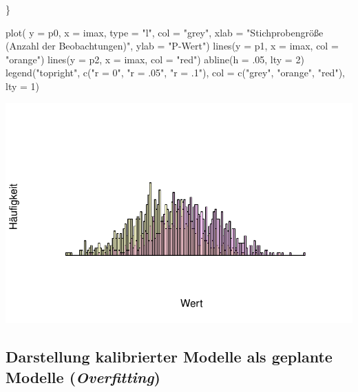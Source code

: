 \documentclass[
  letterpaper,
  DIV=11,
  numbers=noendperiod]{scrreprt}
\newenvironment{Shaded}{\begin{snugshade}}{\end{snugshade}}
\newcommand{\AttributeTok}[1]{\textcolor[rgb]{0.40,0.45,0.13}{#1}}
\newcommand{\DecValTok}[1]{\textcolor[rgb]{0.68,0.00,0.00}{#1}}
\newcommand{\FunctionTok}[1]{\textcolor[rgb]{0.28,0.35,0.67}{#1}}
\newcommand{\NormalTok}[1]{\textcolor[rgb]{0.00,0.23,0.31}{#1}}
\newcommand{\StringTok}[1]{\textcolor[rgb]{0.13,0.47,0.30}{#1}}
\begin{document}
\begin{Shaded}
\begin{Highlighting}[]
\NormalTok{\} }

\FunctionTok{plot}\NormalTok{( }\AttributeTok{y =}\NormalTok{ p0, }\AttributeTok{x =}\NormalTok{ imax, }\AttributeTok{type =} \StringTok{"l"}\NormalTok{, }\AttributeTok{col =} \StringTok{"grey"}\NormalTok{, }\AttributeTok{xlab =} \StringTok{"Stichprobengröße (Anzahl der Beobachtungen)"}\NormalTok{, }\AttributeTok{ylab =} \StringTok{"P{-}Wert"}\NormalTok{) }
\FunctionTok{lines}\NormalTok{(}\AttributeTok{y =}\NormalTok{ p1, }\AttributeTok{x =}\NormalTok{ imax, }\AttributeTok{col =} \StringTok{"orange"}\NormalTok{) }
\FunctionTok{lines}\NormalTok{(}\AttributeTok{y =}\NormalTok{ p2, }\AttributeTok{x =}\NormalTok{ imax, }\AttributeTok{col =} \StringTok{"red"}\NormalTok{) }
\FunctionTok{abline}\NormalTok{(}\AttributeTok{h =}\NormalTok{ .}\DecValTok{05}\NormalTok{, }\AttributeTok{lty =} \DecValTok{2}\NormalTok{)}
\FunctionTok{legend}\NormalTok{(}\StringTok{"topright"}\NormalTok{, }\FunctionTok{c}\NormalTok{(}\StringTok{"r = 0"}\NormalTok{, }\StringTok{"r = .05"}\NormalTok{, }\StringTok{"r = .1"}\NormalTok{), }\AttributeTok{col =} \FunctionTok{c}\NormalTok{(}\StringTok{"grey"}\NormalTok{, }\StringTok{"orange"}\NormalTok{, }\StringTok{"red"}\NormalTok{), }\AttributeTok{lty =} \DecValTok{1}\NormalTok{)}
\end{Highlighting}
\end{Shaded}

\includegraphics{probleme_methoden_files/figure-pdf/unnamed-chunk-1-1.pdf}

\subsection{\texorpdfstring{Darstellung kalibrierter Modelle als
geplante Modelle
(\emph{Overfitting})}{Darstellung kalibrierter Modelle als geplante Modelle (Overfitting)}}\label{darstellung-kalibrierter-modelle-als-geplante-modelle-overfitting}
\end{document}
